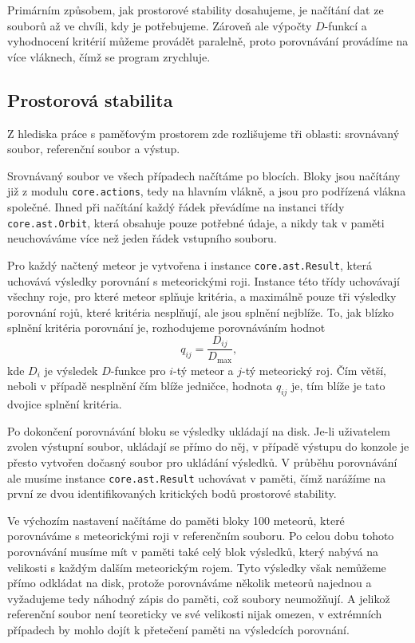 \smallskip

Primárním způsobem, jak prostorové stability dosahujeme, je načítání dat ze souborů až ve chvíli, kdy je potřebujeme. Zároveň ale výpočty $D$-funkcí a vyhodnocení kritérií můžeme provádět paralelně, proto porovnávání provádíme na více vláknech, čímž se program zrychluje.

\subsection{Prostorová stabilita}%
Z hlediska práce s paměťovým prostorem zde rozlišujeme tři oblasti: srovnávaný soubor, referenční soubor a výstup.

\medskip

Srovnávaný soubor ve všech případech načítáme po blocích. Bloky jsou načítány již z modulu \texttt{core.actions}, tedy na hlavním vlákně, a jsou pro podřízená vlákna společné. Ihned při načítání každý řádek převádíme na instanci třídy \texttt{core.ast.Orbit}, která obsahuje pouze potřebné údaje, a nikdy tak v paměti neuchováváme více než jeden řádek vstupního souboru.

Pro každý načtený meteor je vytvořena i instance \texttt{core.ast.Result}, která uchovává výsledky porovnání s meteorickými roji. Instance této třídy uchovávají všechny roje, pro které meteor splňuje kritéria, a maximálně pouze tři výsledky porovnání rojů, které kritéria nesplňují, ale jsou splnění nejblíže. To, jak blízko splnění kritéria porovnání je, rozhodujeme porovnáváním hodnot
\begin{equation}
    q_{ij}=\frac{D_{ij}}{D_\text{max}}\text{,}
\end{equation}
kde $D_i$ je výsledek $D$-funkce pro $i$-tý meteor a $j$-tý meteorický roj. Čím větší, neboli v případě nesplnění čím blíže jedničce, hodnota $q_{ij}$ je, tím blíže je tato dvojice splnění kritéria.

Po dokončení porovnávání bloku se výsledky ukládají na disk. Je-li uživatelem zvolen výstupní soubor, ukládají se přímo do něj, v případě výstupu do konzole je přesto vytvořen dočasný soubor pro ukládání výsledků. V průběhu porovnávání ale musíme instance \texttt{core.ast.Result} uchovávat v paměti, čímž narážíme na první ze dvou identifikovaných kritických bodů prostorové stability.

\smallskip

Ve výchozím nastavení načítáme do paměti bloky 100 meteorů, které porovnáváme s meteorickými roji v referenčním souboru. Po celou dobu tohoto porovnávání musíme mít v paměti také celý blok výsledků, který nabývá na velikosti s každým dalším meteorickým rojem. Tyto výsledky však nemůžeme přímo odkládat na disk, protože porovnáváme několik meteorů najednou a vyžadujeme tedy náhodný zápis do paměti, což soubory neumožňují. A jelikož referenční soubor není teoreticky ve své velikosti nijak omezen, v extrémních případech by mohlo dojít k přetečení paměti na výsledcích porovnání.

